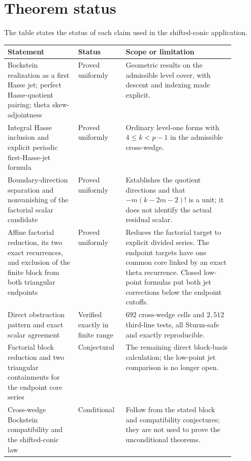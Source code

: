 \section{Theorem status}\label{sec:theorem-status}

The table states the status of each claim used in the shifted-conic
application.

\begingroup
\renewcommand{\arraystretch}{1.18}
\small
\sloppy
{}
\noindent\begin{tabularx}{\linewidth}{@{}>{\raggedright\arraybackslash}p{0.31\linewidth}>{\raggedright\arraybackslash}p{0.21\linewidth}>{\raggedright\arraybackslash}X@{}}
\toprule
Statement & Status & Scope or limitation\\
\midrule
Bockstein realization as a first Hasse jet; perfect Hasse-quotient pairing;
theta skew-adjointness & Proved uniformly & Geometric results on the
admissible level cover, with descent and indexing made explicit.\\
Integral Hasse inclusion and explicit periodic first-Hasse-jet formula &
Proved uniformly & Ordinary level-one forms with $4\leq k<p-1$ in the
admissible cross-wedge.\\
Boundary-direction separation and nonvanishing of the factorial scalar
candidate & Proved uniformly & Establishes the quotient directions and that
$-m(k-2m-2)!$ is a unit; it does not identify the actual residual scalar.\\
Affine factorial reduction, its two exact recurrences, and exclusion of the
finite block from both triangular endpoints & Proved uniformly & Reduces the
factorial target to explicit divided series.  The endpoint targets have one
common core linked by an exact theta recurrence.  Closed low-point formulas
put both jet corrections below the endpoint cutoffs.\\
Direct obstruction pattern and exact scalar agreement & Verified exactly in finite
range & $692$ cross-wedge cells and $2{,}512$ third-line tests, all
Sturm-safe and exactly reproducible.\\
Factorial block reduction and two triangular containments for the endpoint
core series & Conjectural & The remaining direct block-basis calculation;
the low-point jet comparison is no longer open.\\
Cross-wedge Bockstein compatibility and the shifted-conic law & Conditional
& Follow from the stated block and compatibility
conjectures; they are not used to prove the unconditional theorems.\\
\bottomrule
\end{tabularx}
\par
\endgroup
